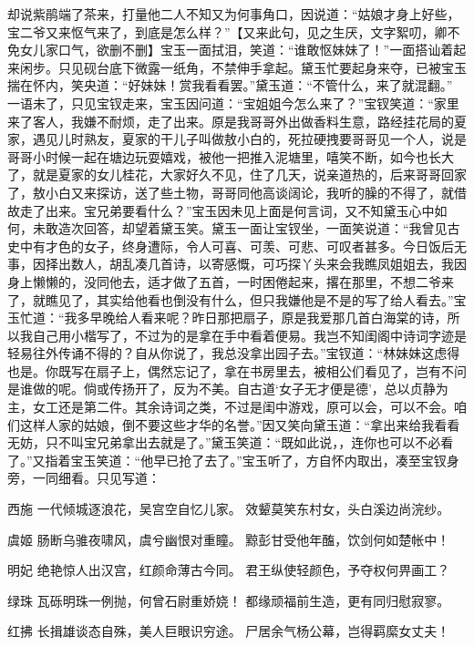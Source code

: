 \documentclass[12pt,oneside]{book}
\begin{document}
却说紫鹃端了茶来，打量他二人不知又为何事角口，因说道：“姑娘才身上好些，宝二爷又来怄气来了，到底是怎么样？”【又来此句，见之生厌，文字絮叨，卿不免女儿家口气，欲删不删】宝玉一面拭泪，笑道：“谁敢怄妹妹了！”一面搭讪着起来闲步。只见砚台底下微露一纸角，不禁伸手拿起。黛玉忙要起身来夺，已被宝玉揣在怀内，笑央道：“好妹妹！赏我看看罢。”黛玉道：“不管什么，来了就混翻。”
一语未了，只见宝钗走来，宝玉因问道：“宝姐姐今怎么来了？”宝钗笑道：“家里来了客人，我嫌不耐烦，走了出来。原是我哥哥外出做香料生意，路经挂花局的夏家，遇见儿时熟友，夏家的干儿子叫做敖小白的，死拉硬拽要哥哥见一个人，说是哥哥小时候一起在塘边玩耍嬉戏，被他一把推入泥塘里，嘻笑不断，如今也长大了，就是夏家的女儿桂花，大家好久不见，住了几天，说亲道热的，后来哥哥回家了，敖小白又来探访，送了些土物，哥哥同他高谈阔论，我听的臊的不得了，就借故走了出来。宝兄弟要看什么？”宝玉因未见上面是何言词，又不知黛玉心中如何，未敢造次回答，却望着黛玉笑。黛玉一面让宝钗坐，一面笑说道：“我曾见古史中有才色的女子，终身遭际，令人可喜、可羡、可悲、可叹者甚多。今日饭后无事，因择出数人，胡乱凑几首诗，以寄感慨，可巧探丫头来会我瞧凤姐姐去，我因身上懒懒的，没同他去，适才做了五首，一时困倦起来，撂在那里，不想二爷来了，就瞧见了，其实给他看也倒没有什么，但只我嫌他是不是的写了给人看去。”宝玉忙道：“我多早晚给人看来呢？昨日那把扇子，原是我爱那几首白海棠的诗，所以我自己用小楷写了，不过为的是拿在手中看着便易。我岂不知闺阁中诗词字迹是轻易往外传诵不得的？自从你说了，我总没拿出园子去。”宝钗道：“林妹妹这虑得也是。你既写在扇子上，偶然忘记了，拿在书房里去，被相公们看见了，岂有不问是谁做的呢。倘或传扬开了，反为不美。自古道‘女子无才便是德’，总以贞静为主，女工还是第二件。其余诗词之类，不过是闺中游戏，原可以会，可以不会。咱们这样人家的姑娘，倒不要这些才华的名誉。”因又笑向黛玉道：“拿出来给我看看无妨，只不叫宝兄弟拿出去就是了。”黛玉笑道：“既如此说，，连你也可以不必看了。”又指着宝玉笑道：“他早已抢了去了。”宝玉听了，方自怀内取出，凑至宝钗身旁，一同细看。只见写道：

西施
一代倾城逐浪花，吴宫空自忆儿家。
效颦莫笑东村女，头白溪边尚浣纱。

虞姬
肠断乌骓夜啸风，虞兮幽恨对重瞳。
黥彭甘受他年醢，饮剑何如楚帐中！

明妃
绝艳惊人出汉宫，红颜命薄古今同。
君王纵使轻颜色，予夺权何畀画工？

绿珠
瓦砾明珠一例抛，何曾石尉重娇娆！
都缘顽福前生造，更有同归慰寂寥。

红拂
长揖雄谈态自殊，美人巨眼识穷途。
尸居余气杨公幕，岂得羁縻女丈夫！
\end{document}
